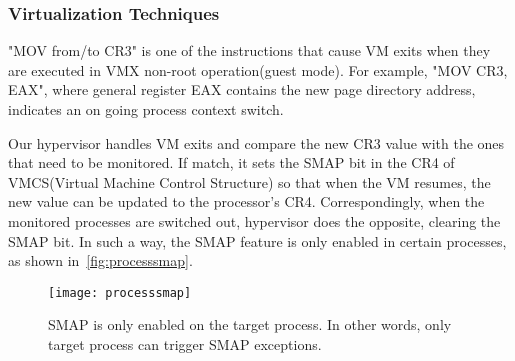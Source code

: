 \subsubsection{Virtualization Techniques}

"MOV from/to CR3" is one of the instructions that cause VM exits when they are executed in VMX non-root operation(guest mode). For example, "MOV CR3, EAX", where general register EAX contains the new page directory address, indicates an on going process context switch.

Our hypervisor handles VM exits and compare the new CR3 value with the ones that need to be monitored. If match, it sets the SMAP bit in the CR4 of VMCS(Virtual Machine Control Structure) so that when the VM resumes, the new value can be updated to the processor's CR4. Correspondingly, when the monitored processes are switched out, hypervisor does the opposite, clearing the SMAP bit. In such a way, the SMAP feature is only enabled in certain processes, as shown in~\autoref{fig:processsmap}.

\begin{figure}[th]
  \texttt{[image: processsmap]}
  \centering
  \caption{SMAP is only enabled on the target process. In other words, only target process can trigger SMAP exceptions.}
  \label{fig:processsmap}
\end{figure}
